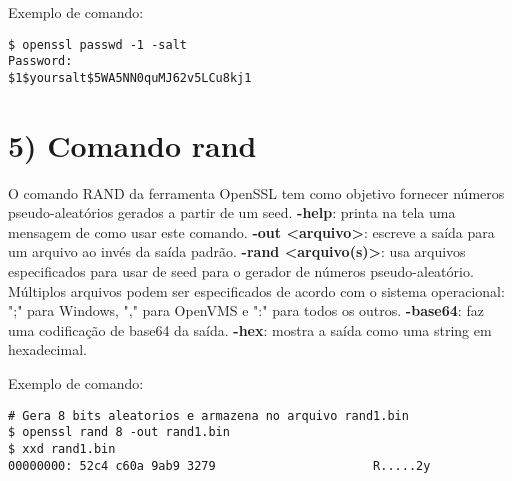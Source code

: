 \documentclass[a4paper,11pt]{article}
\theoremstyle{mytheor}
\begin{document}
\noindent Exemplo de comando:
\begin{lstlisting}
$ openssl passwd -1 -salt
Password:
$1$yoursalt$5WA5NN0quMJ62v5LCu8kj1
\end{lstlisting}

\section*{5) Comando rand}
O comando RAND da ferramenta OpenSSL tem como objetivo fornecer números pseudo-aleatórios gerados a partir de um seed. 
\newline\newline
\noindent \textbf{-help}: printa na tela uma mensagem de como usar este comando.
\newline\newline
\noindent \textbf{-out <arquivo>}: escreve a saída para um arquivo ao invés da saída padrão.
\newline\newline
\noindent \textbf{-rand <arquivo(s)>}: usa arquivos especificados para usar de seed para o gerador de números pseudo-aleatório. Múltiplos arquivos podem ser especificados de acordo com o sistema operacional: ";" para Windows, "," para OpenVMS e ":" para todos os outros.
\newline\newline
\noindent \textbf{-base64}: faz uma codificação de base64 da saída.
\newline\newline
\noindent \textbf{-hex}: mostra a saída como uma string em hexadecimal.
\newline\newline

\noindent Exemplo de comando:
\begin{lstlisting}
# Gera 8 bits aleatorios e armazena no arquivo rand1.bin
$ openssl rand 8 -out rand1.bin
$ xxd rand1.bin
00000000: 52c4 c60a 9ab9 3279                      R.....2y
\end{lstlisting}
\end{document}
